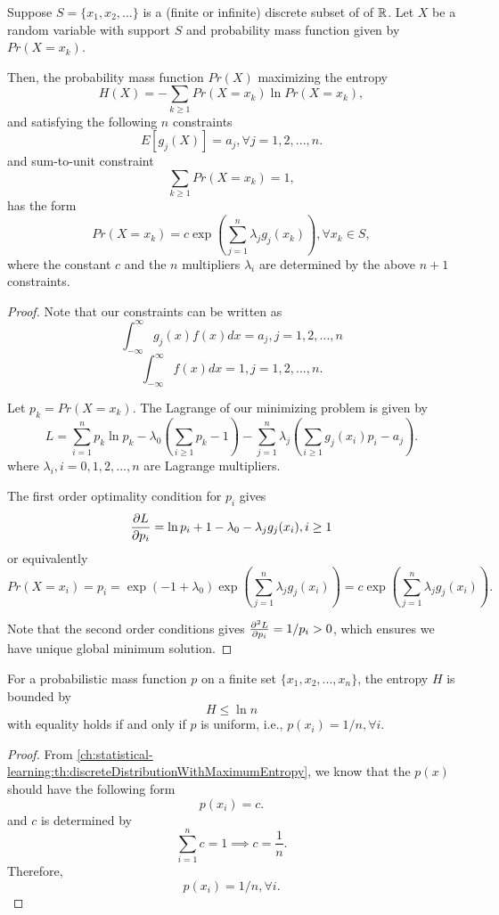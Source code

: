 \begin{refsection}
\begin{theorem}\label{ch:statistical-learning:th:discreteDistributionWithMaximumEntropy}
	Suppose $S = \{x_1,x_2,...\}$ is a (finite or infinite) discrete subset of  of $\mathbb{R}$. Let $X$ be a random variable with support $S$ and probability mass function given by
	$Pr(X = x_k)$.
	
	Then, the probability mass function $Pr(X)$ maximizing the entropy
	$$H(X) = -\sum_{k\geq 1} Pr(X=x_k)\ln Pr(X=x_k),$$
	and satisfying the following $n$ constraints
	$$E[g_j(X)] = a_j, \forall j=1,2,...,n.$$
	and sum-to-unit constraint
	$$\sum_{k\geq 1} Pr(X=x_k) = 1,$$
	has the form
	$$Pr(X=x_k) = c\exp(\sum_{j=1}^{n} \lambda_j g_j(x_k)), \forall x_k \in S,$$
	where the constant $c$ and the $n$ multipliers $\lambda_i$ are determined by the above $n+1$ constraints.
\end{theorem}
\begin{proof}
	Note that our constraints can be written as
	$$\int_{-\infty}^{\infty} g_j(x)f(x) dx = a_j,j = 1,2,...,n $$	
	$$\int_{-\infty}^{\infty} f(x) dx = 1,j = 1,2,...,n.$$	
	
	Let $p_k = Pr(X = x_k)$. The Lagrange of our minimizing problem is given by
	$$L = \sum_{i=1}^{n} p_k\ln p_k - \lambda_0(\sum_{i\geq 1} p_k - 1) - \sum_{j=1}^{n} \lambda_j(\sum_{i\geq 1} g_j(x_i)p_i - a_j).$$
	where $\lambda_i,i=0,1,2,...,n$ are Lagrange multipliers.
	
	The first order optimality condition for $p_i$ gives
	$$\frac{\partial L}{\partial p_i} = \ln p_i + 1 - \lambda_0 - \lambda_j g_j(x_i),i\geq 1$$
	or equivalently 
	$$Pr(X=x_i) = p_i = \exp(-1+\lambda_0) \exp(\sum_{j=1}^{n} \lambda_j g_j(x_i)) = c\exp(\sum_{j=1}^{n} \lambda_j g_j(x_i)).$$
	
	Note that the second order conditions gives $\frac{\partial^2 L}{\partial p_i} = 1/p_i > 0$, which ensures we have unique global minimum solution.	
\end{proof}


\begin{corollary}\hfill
	For a probabilistic mass function $p$ on a finite set $\{x_1,x_2,...,x_n\}$, the entropy $H$ is bounded by
	$$H \leq \ln n$$
	with equality holds if and only if $p$ is uniform, i.e., $p(x_i) = 1/n, \forall i$.
\end{corollary}
\begin{proof}
	From \autoref{ch:statistical-learning:th:discreteDistributionWithMaximumEntropy}, we know that the $p(x)$ should have the following form
	$$p(x_i) = c.$$
	and $c$ is determined by
	$$\sum_{i=1}^n c = 1 \implies c = \frac{1}{n}.$$
	Therefore, 
	$$p(x_i)=1/n, \forall i.$$
\end{proof}


\end{refsection}
